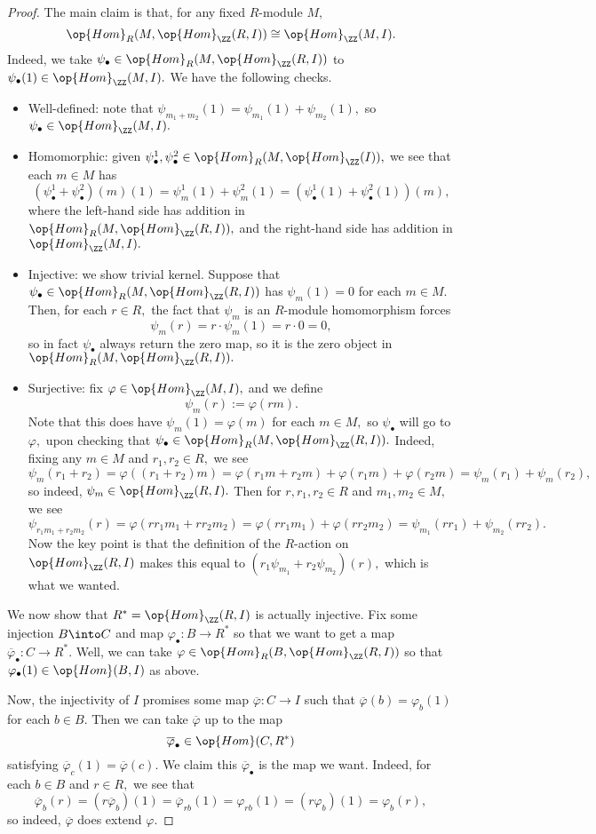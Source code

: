 \begin{proof}
	The main claim is that, for any fixed $R$-module $M,$
	\[\op{Hom}_R(M,\op{Hom}_\ZZ(R,I))\cong\op{Hom}_\ZZ(M,I).\]
	Indeed, we take $\psi_\bullet\in\op{Hom}_R(M,\op{Hom}_\ZZ(R,I))$ to $\psi_\bullet(1)\in\op{Hom}_\ZZ(M,I).$ We have the following checks.
	\begin{itemize}
		\item Well-defined: note that $\psi_{m_1+m_2}(1)=\psi_{m_1}(1)+\psi_{m_2}(1),$ so $\psi_\bullet\in\op{Hom}_\ZZ(M,I).$
		\item Homomorphic: given $\psi^1_\bullet,\psi^2_\bullet\in\op{Hom}_R(M,\op{Hom}_\ZZ(I)),$ we see that each $m\in M$ has
		\[(\psi^1_\bullet+\psi^2_\bullet)(m)(1)=\psi^1_m(1)+\psi^2_m(1)=(\psi^1_\bullet(1)+\psi^2_\bullet(1))(m),\]
		where the left-hand side has addition in $\op{Hom}_R(M,\op{Hom}_\ZZ(R,I)),$ and the right-hand side has addition in $\op{Hom}_\ZZ(M,I).$
		\item Injective: we show trivial kernel. Suppose that $\psi_\bullet\in\op{Hom}_R(M,\op{Hom}_\ZZ(R,I))$ has $\psi_m(1)=0$ for each $m\in M.$ Then, for each $r\in R,$ the fact that $\psi_m$ is an $R$-module homomorphism forces
		\[\psi_m(r)=r\cdot\psi_m(1)=r\cdot0=0,\]
		so in fact $\psi_\bullet$ always return the zero map, so it is the zero object in $\op{Hom}_R(M,\op{Hom}_\ZZ(R,I)).$
		\item Surjective: fix $\varphi\in\op{Hom}_\ZZ(M,I),$ and we define
		\[\psi_m(r):=\varphi(rm).\]
		Note that this does have $\psi_m(1)=\varphi(m)$ for each $m\in M,$ so $\psi_\bullet$ will go to $\varphi,$ upon checking that $\psi_\bullet\in\op{Hom}_R(M,\op{Hom}_\ZZ(R,I)).$ Indeed, fixing any $m\in M$ and $r_1,r_2\in R,$ we see
		\[\psi_m(r_1+r_2)=\varphi((r_1+r_2)m)=\varphi(r_1m+r_2m)+\varphi(r_1m)+\varphi(r_2m)=\psi_m(r_1)+\psi_m(r_2),\]
		so indeed, $\psi_m\in\op{Hom}_\ZZ(R,I).$ Then for $r,r_1,r_2\in R$ and $m_1,m_2\in M,$ we see
		\[\psi_{r_1m_1+r_2m_2}(r)=\varphi(rr_1m_1+rr_2m_2)=\varphi(rr_1m_1)+\varphi(rr_2m_2)=\psi_{m_1}(rr_1)+\psi_{m_2}(rr_2).\]
		Now the key point is that the definition of the $R$-action on $\op{Hom}_\ZZ(R,I)$ makes this equal to $(r_1\psi_{m_1}+r_2\psi_{m_2})(r),$ which is what we wanted.
	\end{itemize}
	We now show that $R^*=\op{Hom}_\ZZ(R,I)$ is actually injective. Fix some injection $B\into C$ and map $\varphi_\bullet:B\to R^*$ so that we want to get a map $\overline\varphi_\bullet:C\to R^*.$ Well, we can take $\varphi\in\op{Hom}_R(B,\op{Hom}_\ZZ(R,I))$ so that $\varphi_\bullet(1)\in\op{Hom}(B,I)$ as above.

	Now, the injectivity of $I$ promises some map $\overline\varphi:C\to I$ such that $\overline\varphi(b)=\varphi_b(1)$ for each $b\in B.$ Then we can take $\overline\varphi$ up to the map
	\[\overline\varphi_\bullet\in\op{Hom}(C,R^*)\]
	satisfying $\overline\varphi_c(1)=\overline\varphi(c).$ We claim this $\overline\varphi_\bullet$ is the map we want. Indeed, for each $b\in B$ and $r\in R,$ we see that
	\[\overline\varphi_b(r)=(r\overline\varphi_b)(1)=\overline\varphi_{rb}(1)=\varphi_{rb}(1)=(r\varphi_b)(1)=\varphi_b(r),\]
	so indeed, $\overline\varphi$ does extend $\varphi.$
\end{proof}
